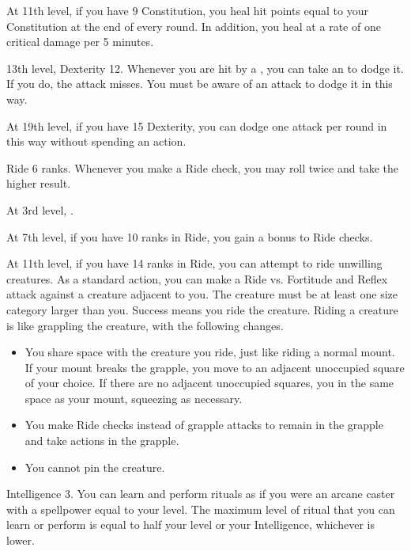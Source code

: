     At 11th level, if you have 9 Constitution, you heal hit points equal to your Constitution at the end of every round.
    In addition, you heal  at a rate of one critical damage per 5 minutes.
    \magical

    \featpres 13th level, Dexterity 12.
    \featben Whenever you are hit by a , you can take an  to dodge it.
    If you do, the attack misses.
    You must be aware of an attack to dodge it in this way.

    At 19th level, if you have 15 Dexterity, you can dodge one attack per round in this way without spending an action.

    \featpre Ride 6 ranks.
    \featben Whenever you make a Ride check, you may roll twice and take the higher result.

    At 3rd level, \tdash.

    At 7th level, if you have 10 ranks in Ride, you gain a  bonus to Ride checks.

    At 11th level, if you have 14 ranks in Ride, you can attempt to ride unwilling creatures.
    As a standard action, you can make a Ride vs. Fortitude and Reflex attack against a creature adjacent to you.
    The creature must be at least one size category larger than you.
    Success means you ride the creature.
    Riding a creature is like grappling the creature, with the following changes.
    \begin{itemize}
        \item You share space with the creature you ride, just like riding a normal mount.
            If your mount breaks the grapple, you move to an adjacent unoccupied square of your choice.
            If there are no adjacent unoccupied squares, you in the same space as your mount, squeezing as necessary.
        \item You make Ride checks instead of grapple attacks to remain in the grapple and take actions in the grapple.
        \item You cannot pin the creature.
    \end{itemize}

    \featpre Intelligence 3.
    \featben You can learn and perform rituals as if you were an arcane caster with a spellpower equal to your level.
    The maximum level of ritual that you can learn or perform is equal to half your level or your Intelligence, whichever is lower.

